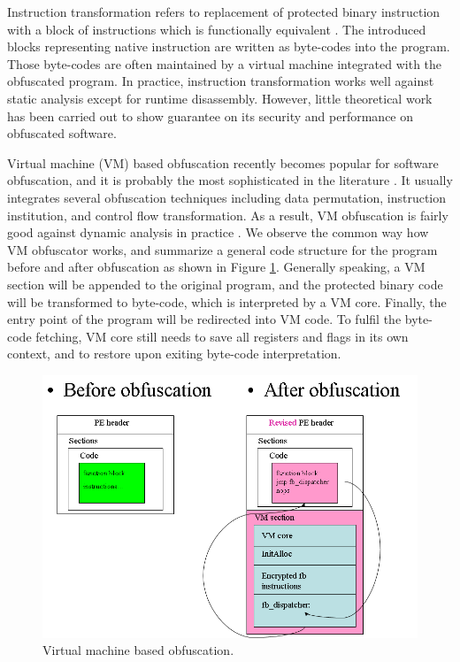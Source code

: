 \documentclass{../style/llncs}                   %
\begin{document}
Instruction transformation refers to replacement of protected binary instruction
with a block of instructions which is functionally equivalent
\cite{linn03,kanzaki04,madou05,popov07,rolles09}.
The introduced blocks representing native instruction are written as byte-codes
into the program. Those byte-codes are often maintained by a virtual machine
integrated with the obfuscated program.
In practice, instruction transformation works well against static analysis
except for runtime disassembly.
However, little theoretical work has been carried out to show
guarantee on its security and performance on obfuscated software.


Virtual machine (VM) based obfuscation recently becomes popular
for software obfuscation,
and it is probably the most sophisticated in the literature
\cite{smith05,sharif09,rolles09}.
It usually integrates several obfuscation techniques including data
permutation, instruction institution, and control flow transformation.
As a result, VM obfuscation is fairly good against dynamic analysis
in practice \cite{vmprotect,oreans,x86virtualizer}.
We observe the common way how VM obfuscator works, and summarize
a general code structure for the program before and after obfuscation
as shown in Figure \ref{fig_obf_virtualizer}.
Generally speaking, a VM section will be appended to the original program,
and the protected binary code will be transformed to byte-code,
which is interpreted by a VM core. Finally, the entry point of the program
will be redirected into VM code.
To fulfil the byte-code fetching, VM core still
needs to save all registers and flags in its own context,
and to restore upon exiting byte-code interpretation.

\begin{figure}  \centering
\includegraphics[width=0.7\columnwidth]{./figure/fig_obf_virtualizer}
\caption{Virtual machine based obfuscation.}
\label{fig_obf_virtualizer}
\end{figure}
\end{document}
